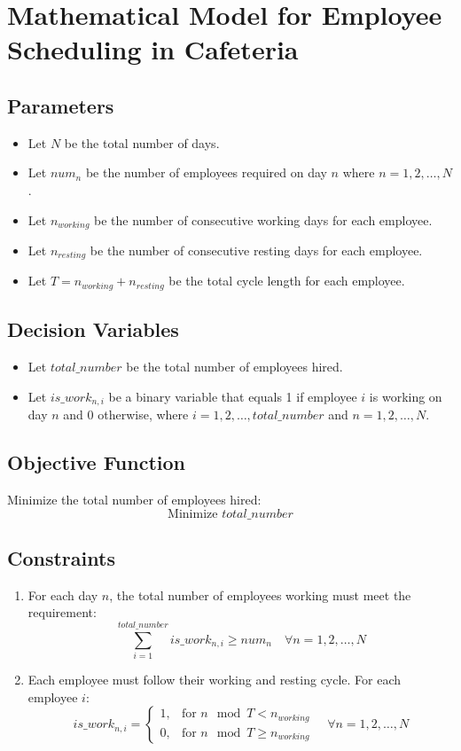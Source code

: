 \documentclass{article}
\begin{document}
\section*{Mathematical Model for Employee Scheduling in Cafeteria}

\subsection*{Parameters}
\begin{itemize}
    \item Let \( N \) be the total number of days.
    \item Let \( num_n \) be the number of employees required on day \( n \) where \( n = 1, 2, \ldots, N \).
    \item Let \( n_{working} \) be the number of consecutive working days for each employee.
    \item Let \( n_{resting} \) be the number of consecutive resting days for each employee.
    \item Let \( T = n_{working} + n_{resting} \) be the total cycle length for each employee.
\end{itemize}

\subsection*{Decision Variables}
\begin{itemize}
    \item Let \( total\_number \) be the total number of employees hired.
    \item Let \( is\_work_{n,i} \) be a binary variable that equals 1 if employee \( i \) is working on day \( n \) and 0 otherwise, where \( i = 1, 2, \ldots, total\_number \) and \( n = 1, 2, \ldots, N \).
\end{itemize}

\subsection*{Objective Function}
Minimize the total number of employees hired:
\[
\text{Minimize } total\_number
\]

\subsection*{Constraints}
\begin{enumerate}
    \item For each day \( n \), the total number of employees working must meet the requirement:
    \[
    \sum_{i=1}^{total\_number} is\_work_{n,i} \geq num_n \quad \forall n = 1, 2, \ldots, N
    \]
    
    \item Each employee must follow their working and resting cycle. For each employee \( i \):
    \[
    is\_work_{n,i} = 
    \begin{cases}
      1, & \text{for } n \mod T < n_{working} \\
      0, & \text{for } n \mod T \geq n_{working}
    \end{cases} \quad \forall n = 1, 2, \ldots, N
    \]
    
\end{enumerate}
\end{document}
